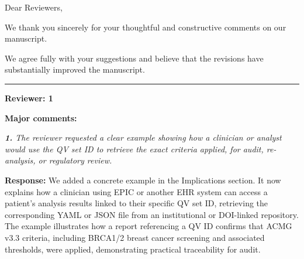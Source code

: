 \documentclass[12pt,a4paper]{letter}
\begin{document}
 
\raggedright
\begin{letter}{Dear Reviewers,}


\opening{}

We thank you sincerely for your thoughtful and constructive comments on our manuscript.

We agree fully with your suggestions and believe that the revisions have substantially improved the manuscript.


\noindent\rule{\textwidth}{0.4pt}

\textbf{Reviewer: 1}


\textbf{Major comments:}

 
\textit{\textbf{1.} The reviewer requested a clear example showing how a clinician or analyst would use the QV set ID to retrieve the exact criteria applied, for audit, re-analysis, or regulatory review.}

\textbf{Response:} We added a concrete example in the Implications section. It now explains how a clinician using EPIC or another EHR system can access a patient’s analysis results linked to their specific QV set ID, retrieving the corresponding YAML or JSON file from an institutional or DOI-linked repository. The example illustrates how a report referencing a QV ID confirms that ACMG v3.3 criteria, including BRCA1/2 breast cancer screening and associated thresholds, were applied, demonstrating practical traceability for audit.


\end{letter}
\end{document}
